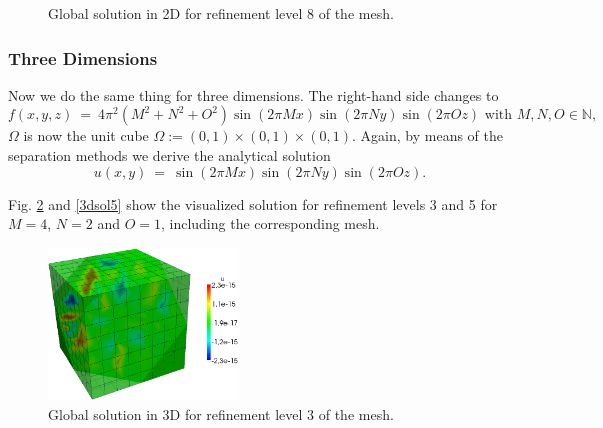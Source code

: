 \documentclass[a4paper, 11pt, twoside]{article}
\begin{document}
\begin{figure}[h!]
	\centering
\caption{Global solution in 2D for refinement level 8 of the mesh.}
\label{2dsol8}
\end{figure}



\subsubsection{Three Dimensions}\label{sectionthreedimensions}
Now we do the same thing for three dimensions. The right-hand side changes to
\begin{equation}
f(x,y,z)\ =\ 4 \pi^2 (M^2 + N^2 + O^2) \sin(2 \pi M x ) \sin(2 \pi N y) \sin(2 \pi O z ) \text{ with } M,N,O \in \mathbb{N}, 
\end{equation}
$\Omega$ is now the unit cube $\Omega:=(0,1)\times(0,1)\times(0,1)$. Again, by means of the separation methods we derive the analytical solution 
\begin{equation}\label{exactSolution}
u(x,y)\ =\ \sin(2 \pi M x ) \sin(2 \pi N y) \sin(2 \pi O z).  
\end{equation}

Fig. \ref{3dsol3} and \ref{3dsol5} show the visualized solution for refinement levels 3 and 5 for $M=4$, $N=2$ and $O=1$, including the corresponding mesh.

\begin{figure}[h!]
	\centering
		\includegraphics[width=0.45\textwidth]{fig/u_poisson_tut_3d_lvl3_M2N4O1_mesh_trans.png}
\caption{Global solution in 3D for refinement level 3 of the mesh.}
\label{3dsol3}
\end{figure}
\end{document}
